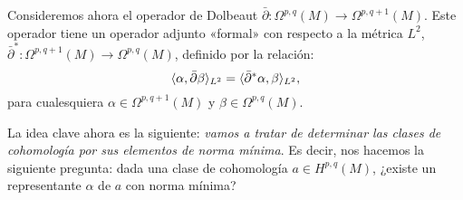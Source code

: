 \documentclass[12pt,a4paper]{article}
\theoremstyle{definition} \newtheorem{defn}[thm]{Definición}
\theoremstyle{definition} \newtheorem{ejemplo}[thm]{Ejemplo}
\theoremstyle{definition} \newtheorem{ejercicio}[thm]{Ejercicio}
\theoremstyle{remark} \newtheorem*{obs}{Observación}
\DeclarePairedDelimiter\esc{\langle}{\rangle}
\newcommand{\dol}{\bar{\partial}}
\begin{document}
  Consideremos ahora el operador de Dolbeaut $\bar{\partial}:\Omega^{p,q}(M) \rightarrow \Omega^{p,q+1}(M)$. Este operador tiene un operador adjunto «formal» con respecto a la métrica $L^2$, $\dol^*:\Omega^{p,q+1}(M) \rightarrow \Omega^{p,q}(M)$, definido por la relación:
  \begin{equation*}
    \esc{\alpha,\dol \beta}_{L^2}=\esc{\dol^* \alpha,\beta}_{L^2},
  \end{equation*}
  para cualesquiera $\alpha \in \Omega^{p,q+1}(M)$ y $\beta \in \Omega^{p,q}(M)$.

  La idea clave ahora es la siguiente: \textit{vamos a tratar de determinar las clases de cohomología por sus elementos de norma mínima}. Es decir, nos hacemos la siguiente pregunta: dada una clase de cohomología $a\in H^{p,q}(M)$, ¿existe un representante $\alpha$ de $a$ con norma mínima?
\end{document}
